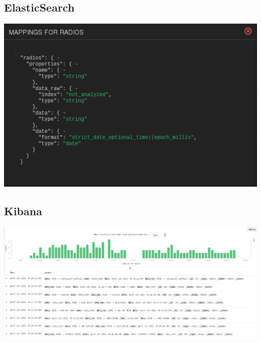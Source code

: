 \documentclass{beamer}
\begin{document}
\subsection{ElasticSearch}

\begin{frame}
	\begin{center}
		\includegraphics[scale=0.50]{mapping.png}
	\end{center}
\end{frame}

\subsection{Kibana}

\begin{frame}
	\begin{center}
		\includegraphics[scale=0.20]{frequence.png}
	\end{center}
\end{frame}
\end{document}
